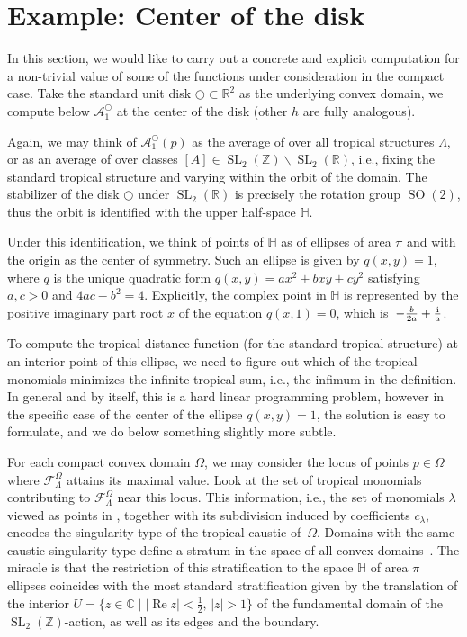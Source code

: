 \documentclass[pdftex]{sigma}
\numberwithin{equation}{section}
\theoremstyle{definition}
\newcommand\ZZ{\mathbb Z}
\newcommand\SL{\operatorname{SL}}
\begin{document}
\section{Example: Center of the disk}\label{sec:example}
In this section, we would like to carry out a concrete and explicit computation for a non-trivial value of some of the functions under consideration in the compact case. Take the standard unit disk $\bigcirc\subset\mathbb{R}^2$ as the underlying convex domain, we compute below $\mathcal{A}_1^\bigcirc$ at the center of the disk (other $h$ are fully analogous).

Again, we may think of $\mathcal{A}_1^{\bigcirc}(p)$ as the average of  over all tropical structures $\Lambda$, or as an average of  over classes $[A]\in\SL_2(\mathbb{Z})\backslash\SL_2(\mathbb{R})$, i.e., fixing the standard tropical structure and varying within the orbit of the domain. The stabilizer of the disk $\bigcirc$ under $\SL_2(\mathbb{R})$ is precisely the rotation group $\operatorname{SO}(2)$, thus the orbit is identified with the upper half-space $\mathbb{H}$.

Under this identification, we think of points of $\mathbb{H}$ as of ellipses of area $\pi$ and with the origin as the center of symmetry. Such an ellipse is given by $q(x,y)=1$, where $q$ is the unique quadratic form $q(x,y)=ax^2+bxy+cy^2$ satisfying $a,c>0$ and $4ac-b^2=4$. Explicitly, the complex point in $\mathbb{H}$ is represented by the positive imaginary part root $x$ of the equation $q(x,1)=0$, which is~${-\frac{b}{2a}+\frac{{\rm i}}{a}}$.

To compute the tropical distance function (for the standard tropical structure) at an interior point of this ellipse, we need to figure out which of the tropical monomials minimizes the infinite tropical sum, i.e., the infimum in the definition. In general and by itself, this is a hard linear programming problem, however in the specific case of the center of the ellipse $q(x,y)=1$, the solution is easy to formulate, and we do below something slightly more subtle.

For each compact convex domain $\Omega$, we may consider the locus of points $p\in\Omega$ where $\mathcal{F}_\Lambda^\Omega$ attains its maximal value. Look at the set of tropical monomials contributing to $\mathcal{F}_\Lambda^\Omega$ near this locus. This information, i.e., the set of monomials $\lambda$ viewed as points in \smash{$\bigl(\ZZ^2\bigr)^*$}, together with its subdivision induced by coefficients $c_\lambda$, encodes the singularity type of the tropical caustic of~$\Omega$. Domains with the same caustic singularity type define a stratum in the space of all convex domains~\cite{thesism}. The miracle is that the restriction of this stratification to the space $\mathbb{H}$ of area $\pi$ ellipses coincides with the most standard stratification given by the translation of the interior $U=\bigl\{z\in\mathbb{C}\mid |{\operatorname{Re} z}|<\frac{1}{2},\, |z|>1\bigr\}$ of the fundamental domain of the $\SL_2(\mathbb{Z})$-action, as well as its edges and the boundary.
\end{document}
